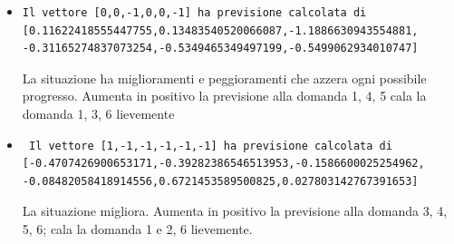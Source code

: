 \begin{itemize}
\item \begin{verbatim}Il vettore [0,0,-1,0,0,-1] ha previsione calcolata di
[0.11622418555447755,0.13483540520066087,-1.1886630943554881,
-0.31165274837073254,-0.5349465349497199,-0.5499062934010747]
\end{verbatim}
La situazione ha miglioramenti e peggioramenti che azzera ogni possibile progresso. Aumenta in positivo la previsione alla domanda 1, 4, 5  cala la domanda  1, 3, 6 lievemente

\item \begin{verbatim} Il vettore [1,-1,-1,-1,-1,-1] ha previsione calcolata di
[-0.4707426900653171,-0.39282386546513953,-0.1586600025254962,
-0.08482058418914556,0.6721453589500825,0.027803142767391653]
\end{verbatim}
La situazione migliora. Aumenta in positivo la previsione alla domanda 3, 4, 5, 6;  cala la domanda 1 e 2, 6 lievemente.

\end{itemize} 

